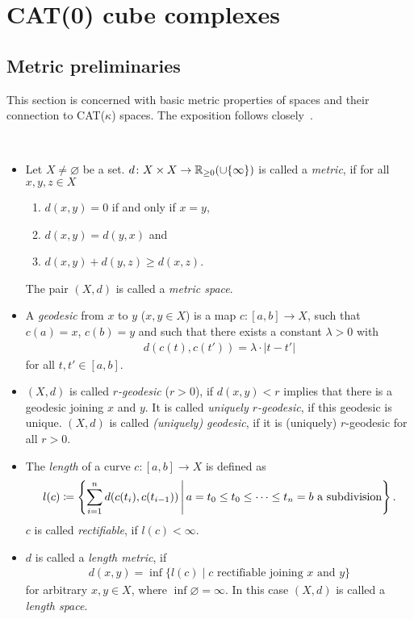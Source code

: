 \section{CAT(0) cube complexes}
\label{sec:complexes}

\subsection{Metric preliminaries}
\label{sec:metric}
This section is concerned with basic metric properties of spaces and their connection to CAT(\(\kappa\)) spaces. The exposition follows closely~\cite{MR1744486}.

\begin{defin}~
  \begin{itemize}
  \item Let \(X\neq \varnothing\) be a set. \(d\colon X \times X \to \mathbb{R}_{\geq 0} (\cup \{\infty\})\) is called a \emph{metric}, if for all \(x,y,z \in X\)
    \begin{enumerate}
    \item \(d(x,y) = 0\) if and only if \(x = y\),
    \item \(d(x,y) = d(y,x)\) and
    \item \(d(x,y) + d(y,z) \geq d(x,z)\).
    \end{enumerate}
    The pair \((X,d)\) is called a \emph{metric space}.
  \item A \emph{geodesic} from \(x\) to \(y\) (\(x,y \in X\)) is a map \(c\colon [a,b] \to X\), such that \(c(a) = x\), \(c(b) = y\) and such that there exists a constant \(\lambda > 0\) with
    \begin{align*}
      d(c(t), c(t')) = \lambda \cdot |t - t'| 
    \end{align*}
    for all \(t,t' \in [a,b]\).
  \item \((X,d)\) is called \emph{\(r\)-geodesic} (\(r > 0\)), if \(d(x,y) < r\) implies that there is a geodesic joining \(x\) and \(y\). It is called \emph{uniquely \(r\)-geodesic}, if this geodesic is unique. \((X,d)\) is called \emph{(uniquely) geodesic}, if it is (uniquely) \(r\)-geodesic for all \(r > 0\).
  \item The \emph{length} of a curve \(c\colon [a,b] \to X\) is defined as
    \begin{align*}
      l(c) \coloneqq \left\{\sum_{i=1}^n d(c(t_i), c(t_{i-1})) \,\middle|\, a = t_0 \leq t_0 \leq \dots \leq t_n = b \text{ a subdivision} \right\}.
    \end{align*}
    \(c\) is called \emph{rectifiable}, if \(l(c) < \infty\).
  \item \(d\) is called a \emph{length metric}, if
    \begin{align*}
      d(x,y) = \inf \{l(c) \mid c \text{ rectifiable joining } x \text{ and } y\}
    \end{align*}
    for arbitrary \(x,y \in X\), where \(\inf\varnothing = \infty\). In this case \((X,d)\) is called a \emph{length space}.
  \end{itemize}
\end{defin}

